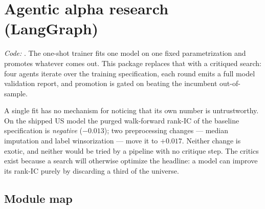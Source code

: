 \documentclass[11pt]{article}
\begin{document}
\section{Agentic alpha research (LangGraph)}
\label{sec:research}

\emph{Code:} . The one-shot trainer fits one model on one
fixed parametrization and promotes whatever comes out. This package replaces that
with a critiqued search: four agents iterate over the training specification, each
round emits a full model validation report, and promotion is gated on beating the
incumbent out-of-sample.

\begin{keybox}
A single fit has no mechanism for noticing that its own number is untrustworthy. On
the shipped US  model the purged walk-forward rank-IC of the
baseline specification is \emph{negative} ($-0.013$); two preprocessing changes ---
median imputation and label winsorization --- move it to $+0.017$. Neither change is
exotic, and neither would be tried by a pipeline with no critique step. The critics
exist because a search will otherwise optimize the headline: a model can improve its
rank-IC purely by discarding a third of the universe.
\end{keybox}

\subsection{Module map}
\end{document}
